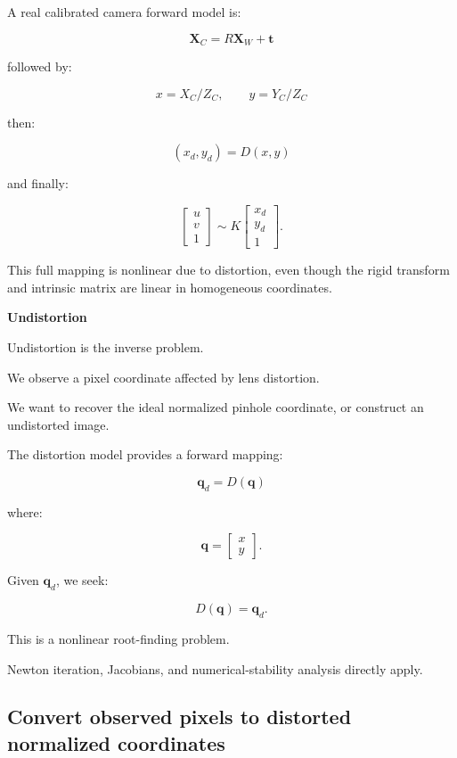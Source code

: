 A real calibrated camera forward model is:

\[
 \boxed{ \mathbf X_C=R\mathbf X_W+\mathbf t }
\]

followed by:

\[
 \boxed{ x=X_C/Z_C,\qquad y=Y_C/Z_C }
\]

then:

\[
 \boxed{ (x_d,y_d)=D(x,y) }
\]

and finally:

\[
 \boxed{ \begin{bmatrix}u\\v\\1\end{bmatrix} \sim K \begin{bmatrix}x_d\\y_d\\1\end{bmatrix} }.
\]

This full mapping is nonlinear due to distortion, even though the rigid transform and intrinsic matrix are linear in homogeneous coordinates.

\textbf{Undistortion}

Undistortion is the inverse problem.

We observe a pixel coordinate affected by lens distortion.

We want to recover the ideal normalized pinhole coordinate, or construct an undistorted image.

The distortion model provides a forward mapping:

\[
 \boxed{ \mathbf q_d=D(\mathbf q) }
\]

where:

\[
 \mathbf q= \begin{bmatrix}x\\y\end{bmatrix}.
\]

Given \(\mathbf q_d\), we seek:

\[
 \boxed{ D(\mathbf q)=\mathbf q_d }.
\]

This is a nonlinear root-finding problem.

Newton iteration, Jacobians, and numerical-stability analysis directly apply.

\subsection{Convert observed pixels to distorted normalized coordinates}\label{02-foundations-ii-ch035-convert-observed-pixels-to-distorted-normalized-coordinates}

